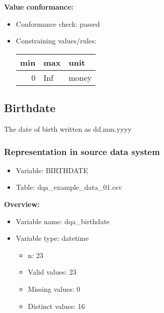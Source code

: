 \documentclass[
]{article}
\providecommand{\tightlist}{%
  \setlength{\itemsep}{0pt}\setlength{\parskip}{0pt}}
\begin{document}
\textbf{Value conformance:}

\begin{itemize}
\tightlist
\item
  Conformance check: passed
\item
  Constraining values/rules:

  \begin{table}[H]
  \centering
  \begin{tabular}{r|l|l}
  \hline
  \textbf{min} & \textbf{max} & \textbf{unit}\\
  \hline
  0 & Inf & money\\
  \hline
  \end{tabular}
  \end{table}
\end{itemize}

\newpage

\hypertarget{birthdate}{%
\subsection{Birthdate}\label{birthdate}}

The date of birth written as dd.mm.yyyy

\hypertarget{representation-in-source-data-system-2}{%
\subsubsection{\texorpdfstring{Representation in \textbf{source} data
system}{Representation in source data system}}\label{representation-in-source-data-system-2}}

\begin{itemize}
\tightlist
\item
  Variable: BIRTHDATE
\item
  Table: dqa\_example\_data\_01.csv
\end{itemize}

\textbf{Overview:}

\begin{itemize}
\tightlist
\item
  Variable name: dqa\_birthdate
\item
  Variable type: datetime

  \begin{itemize}
  \tightlist
  \item
    n: 23
  \item
    Valid values: 23
  \item
    Missing values: 0
  \item
    Distinct values: 16
  \end{itemize}
\end{itemize}
\end{document}
